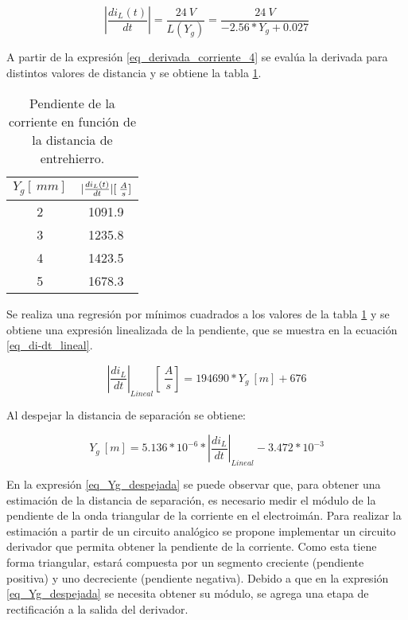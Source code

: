 \begin{equation} \label{eq_derivada_corriente_4}
	\left|\frac{di_L(t)}{dt}\right|= \frac{24\:V}{L(Y_g)}=\frac{24\:V}{-2.56*Y_{g}+0.027}
\end{equation}

A partir de la expresión \ref{eq_derivada_corriente_4} se evalúa la derivada para distintos valores de distancia y se obtiene la tabla \ref{tab_derivada_linealizada}.

\begin{table}[H]
	\begin{center}
		\begin{tabular}{| c | c |}
			\hline
			$Y_g[\:mm]$ & $\lvert\frac{di_L(t)}{dt}\rvert [\:\frac{A}{s}]$\\ \hline
			2 & 1091.9 \\ \hline 
			3 & 1235.8 \\ \hline 
			4 & 1423.5 \\ \hline 
			5 & 1678.3 \\ \hline 
		\end{tabular}
		\caption{Pendiente de la corriente en función de la distancia de entrehierro.}
		\label{tab_derivada_linealizada}
	\end{center}
\end{table}

Se realiza una regresión por mínimos cuadrados a los valores de la tabla \ref{tab_derivada_linealizada} y se obtiene una expresión linealizada de la pendiente, que se  muestra en la ecuación \ref{eq_di-dt_lineal}.


\begin{equation} \label{eq_di-dt_lineal}
	{\left|\frac{di_L}{dt}\right|}_{Lineal}[\:\frac{A}{s}]= 194690 * Y_g\:[m]+676
\end{equation}

Al despejar la distancia de separación se obtiene:

\begin{equation} \label{eq_Yg_despejada}
	Y_g\:[m] =5.136*10^{-6}*{\left|\frac{di_L}{dt}\right|}_{Lineal} - 3.472*10^{-3}
\end{equation}


En la expresión \ref{eq_Yg_despejada} se puede observar que, para obtener una estimación de la distancia de separación, es necesario medir el módulo de la pendiente de la onda triangular de la corriente en el electroimán. Para realizar la estimación a partir de un circuito analógico se propone implementar un circuito derivador que permita obtener la pendiente de la corriente. Como esta tiene forma triangular, estará compuesta por un segmento creciente (pendiente positiva) y uno decreciente (pendiente negativa). Debido a que en la expresión \ref{eq_Yg_despejada} se necesita obtener su módulo, se agrega una etapa de rectificación a la salida del derivador.

